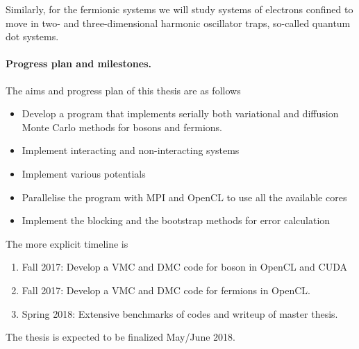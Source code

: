 \documentclass[%
oneside,                 %
final,                   %
10pt]{article}
\begin{document}
Similarly, for the fermionic systems we will study systems of electrons confined to move in two- and three-dimensional harmonic oscillator traps, so-called quantum dot systems.


\paragraph{Progress plan and milestones.}
The aims and progress plan of this thesis are as follows

\begin{itemize}
\item Develop a program that implements serially both variational and diffusion Monte Carlo methods for bosons and fermions.

\item Implement interacting and non-interacting systems

\item Implement various potentials

\item Parallelise the program with MPI and OpenCL to use all the available cores

\item Implement the blocking and the bootstrap methods  for error calculation
\end{itemize}

\noindent
The more explicit timeline is 

\begin{enumerate}
 \item Fall 2017: Develop a VMC and DMC code for boson in OpenCL and CUDA

 \item Fall 2017: Develop a VMC and DMC  code for fermions in OpenCL.

 \item Spring 2018: Extensive benchmarks of codes and writeup of master thesis.
\end{enumerate}

\noindent
The thesis is expected to be finalized May/June 2018.

















\end{document}
